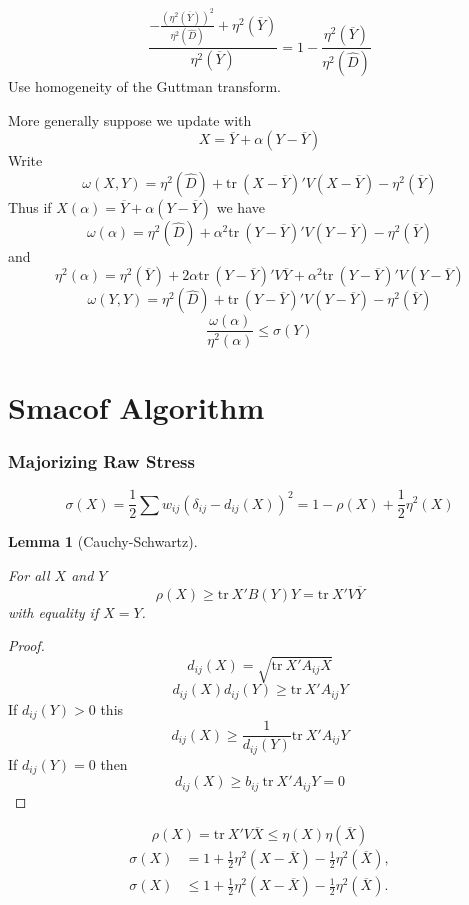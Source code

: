 \documentclass[
  12pt,
  letterpaper,
  DIV=11,
  numbers=noendperiod]{scrartcl}
\theoremstyle{plain}
\newtheorem{lemma}{Lemma}[section]
\theoremstyle{remark}
\begin{document}
\[
\frac{-\frac{(\eta^2(\overline Y))^2}{\eta^2(\hat D)}+\eta^2(\overline Y)}{\eta^2(\overline Y)}=1-\frac{\eta^2(\overline Y)}{\eta^2(\hat D)}
\] Use homogeneity of the Guttman transform.

More generally suppose we update with \[
X=\overline Y+\alpha(Y-\overline Y)
\] Write \[
\omega(X,Y)=\eta^2(\hat D)+\text{tr}\ (X-\overline Y)'V(X-\overline Y)-\eta^2(\overline Y)
\] Thus if \(X(\alpha)=\overline Y+\alpha(Y-\overline Y)\) we have \[
\omega(\alpha)=\eta^2(\hat D)+\alpha^2\text{tr}\ (Y-\overline Y)'V(Y-\overline Y)-\eta^2(\overline Y)
\] and \[
\eta^2(\alpha)=\eta^2(\overline Y)+2\alpha\text{tr}\ (Y-\overline Y)'V\overline Y+\alpha^2\text{tr}\ (Y-\overline Y)'V(Y-\overline Y)
\] \[
\omega(Y,Y)=\eta^2(\hat D)+\text{tr}\ (Y-\overline Y)'V(Y-\overline Y)-\eta^2(\overline Y)
\] \[
\frac{\omega(\alpha)}{\eta^2(\alpha)}\leq\sigma(Y)
\]

\section{Smacof Algorithm}\label{smacof-algorithm}

\subsubsection{Majorizing Raw Stress}\label{majorizing-raw-stress}

\[
\sigma(X)=\frac12\sum w_{ij}(\delta_{ij}-d_{ij}(X))^2=1-\rho(X)+\frac12\eta^2(X)
\]

\begin{lemma}[Cauchy-Schwartz]\protect\hypertarget{lem-cs}{}\label{lem-cs}

For all \(X\) and \(Y\) \[
\rho(X)\geq\text{tr}\ X'B(Y)Y=\text{tr}\ X'V\overline{Y}
\] with equality if \(X=Y\).

\end{lemma}

\begin{proof}
\[
d_{ij}(X)=\sqrt{\text{tr}\ X'A_{ij}X}
\] \[
d_{ij}(X)d_{ij}(Y)\geq\text{tr}\ X'A_{ij}Y
\] If \(d_{ij}(Y)>0\) this \[
d_{ij}(X)\geq\frac{1}{d_{ij}(Y)}\text{tr}\ X'A_{ij}Y
\] If \(d_{ij}(Y)=0\) then \[
d_{ij}(X)\geq b_{ij}\ \text{tr}\ X'A_{ij}Y=0
\]
\end{proof}

\[
\rho(X)=\text{tr}\ X'V\overline X\leq\eta(X)\eta(\overline X)
\] \begin{align}
\sigma(X)&=1+\frac12\eta^2(X-\overline X)-\frac12\eta^2(\overline X),\\
\sigma(X)&\leq 1+\frac12\eta^2(X-\overline X)-\frac12\eta^2(\overline X).
\end{align}
\end{document}
